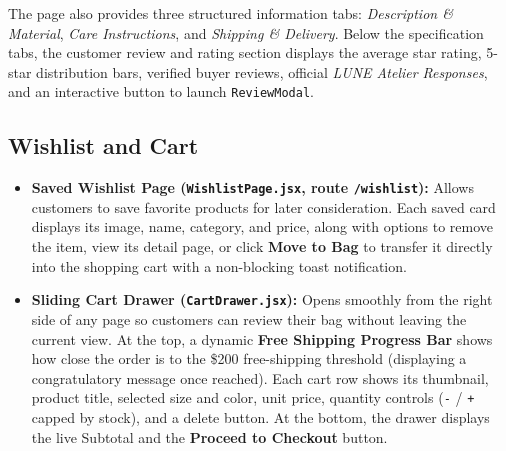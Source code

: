 \documentclass[12pt,a4paper,oneside]{report}
\begin{document}
The page also provides three structured information tabs: \textit{Description \& Material}, \textit{Care Instructions}, and \textit{Shipping \& Delivery}. Below the specification tabs, the customer review and rating section displays the average star rating, 5-star distribution bars, verified buyer reviews, official \textit{LUNE Atelier Responses}, and an interactive button to launch \texttt{ReviewModal}.

\subsection{Wishlist and Cart}
\begin{itemize}[leftmargin=1.2cm]
    \item \textbf{Saved Wishlist Page (\texttt{WishlistPage.jsx}, route \texttt{/wishlist}):} Allows customers to save favorite products for later consideration. Each saved card displays its image, name, category, and price, along with options to remove the item, view its detail page, or click \textbf{Move to Bag} to transfer it directly into the shopping cart with a non-blocking toast notification.
    \item \textbf{Sliding Cart Drawer (\texttt{CartDrawer.jsx}):} Opens smoothly from the right side of any page so customers can review their bag without leaving the current view. At the top, a dynamic \textbf{Free Shipping Progress Bar} shows how close the order is to the \$200 free-shipping threshold (displaying a congratulatory message once reached). Each cart row shows its thumbnail, product title, selected size and color, unit price, quantity controls (\texttt{-} / \texttt{+} capped by stock), and a delete button. At the bottom, the drawer displays the live Subtotal and the \textbf{Proceed to Checkout} button.
\end{itemize}
\end{document}
